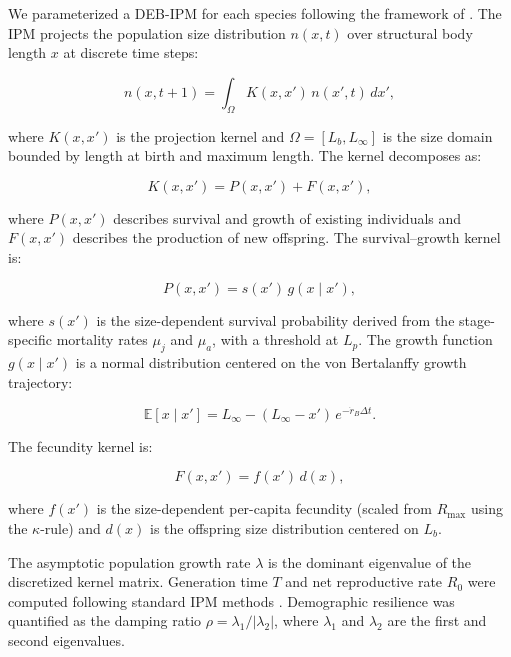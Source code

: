\documentclass[11pt]{article}
\begin{document}
We parameterized a DEB-IPM for each species following the framework of \citet{smallegange2017}. The IPM projects the population size distribution $n(x, t)$ over structural body length $x$ at discrete time steps:

\begin{equation}
n(x, t+1) = \int_{\Omega} K(x, x') \, n(x', t) \, dx',
\label{eq:ipm}
\end{equation}

\noindent where $K(x, x')$ is the projection kernel and $\Omega = [L_b, L_\infty]$ is the size domain bounded by length at birth and maximum length. The kernel decomposes as:

\begin{equation}
K(x, x') = P(x, x') + F(x, x'),
\end{equation}

\noindent where $P(x, x')$ describes survival and growth of existing individuals and $F(x, x')$ describes the production of new offspring. The survival--growth kernel is:

\begin{equation}
P(x, x') = s(x') \, g(x \mid x'),
\end{equation}

\noindent where $s(x')$ is the size-dependent survival probability derived from the stage-specific mortality rates $\mu_j$ and $\mu_a$, with a threshold at $L_p$. The growth function $g(x \mid x')$ is a normal distribution centered on the von Bertalanffy growth trajectory:

\begin{equation}
\mathbb{E}[x \mid x'] = L_\infty - (L_\infty - x') \, e^{-\dot{r}_B \Delta t}.
\end{equation}

The fecundity kernel is:

\begin{equation}
F(x, x') = f(x') \, d(x),
\end{equation}

\noindent where $f(x')$ is the size-dependent per-capita fecundity (scaled from $R_{\max}$ using the $\kappa$-rule) and $d(x)$ is the offspring size distribution centered on $L_b$.

The asymptotic population growth rate $\lambda$ is the dominant eigenvalue of the discretized kernel matrix. Generation time $T$ and net reproductive rate $R_0$ were computed following standard IPM methods \citep{merow2014, caswell2001}. Demographic resilience was quantified as the damping ratio $\rho = \lambda_1 / |\lambda_2|$, where $\lambda_1$ and $\lambda_2$ are the first and second eigenvalues.
\end{document}
